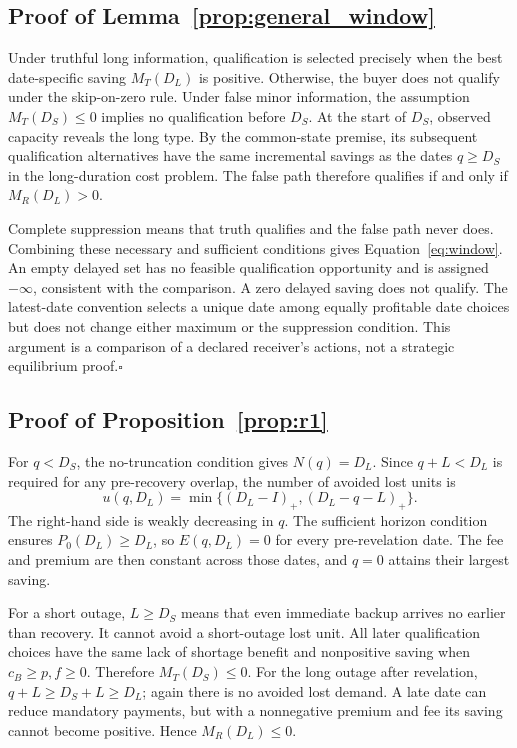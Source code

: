 \documentclass[preprint,11pt,authoryear]{elsarticle}
\begin{document}
\subsection{Proof of Lemma~\ref{prop:general_window}}
Under truthful long information, qualification is selected precisely when the best date-specific saving $M_T(D_L)$ is positive. Otherwise, the buyer does not qualify under the skip-on-zero rule. Under false minor information, the assumption $M_T(D_S)\le0$ implies no qualification before $D_S$. At the start of $D_S$, observed capacity reveals the long type. By the common-state premise, its subsequent qualification alternatives have the same incremental savings as the dates $q\ge D_S$ in the long-duration cost problem. The false path therefore qualifies if and only if $M_R(D_L)>0$.

Complete suppression means that truth qualifies and the false path never does. Combining these necessary and sufficient conditions gives Equation~\eqref{eq:window}. An empty delayed set has no feasible qualification opportunity and is assigned $-\infty$, consistent with the comparison. A zero delayed saving does not qualify. The latest-date convention selects a unique date among equally profitable date choices but does not change either maximum or the suppression condition. This argument is a comparison of a declared receiver's actions, not a strategic equilibrium proof.\hfill$\square$

\subsection{Proof of Proposition~\ref{prop:r1}}
For $q<D_S$, the no-truncation condition gives $N(q)=D_L$. Since $q+L<D_L$ is required for any pre-recovery overlap, the number of avoided lost units is
\[
 u(q,D_L)=\min\{(D_L-I)_+,(D_L-q-L)_+\}.
\]
The right-hand side is weakly decreasing in $q$. The sufficient horizon condition ensures $P_0(D_L)\ge D_L$, so $E(q,D_L)=0$ for every pre-revelation date. The fee and premium are then constant across those dates, and $q=0$ attains their largest saving.

For a short outage, $L\ge D_S$ means that even immediate backup arrives no earlier than recovery. It cannot avoid a short-outage lost unit. All later qualification choices have the same lack of shortage benefit and nonpositive saving when $c_B\ge p,f\ge0$. Therefore $M_T(D_S)\le0$. For the long outage after revelation, $q+L\ge D_S+L\ge D_L$; again there is no avoided lost demand. A late date can reduce mandatory payments, but with a nonnegative premium and fee its saving cannot become positive. Hence $M_R(D_L)\le0$.
\end{document}
